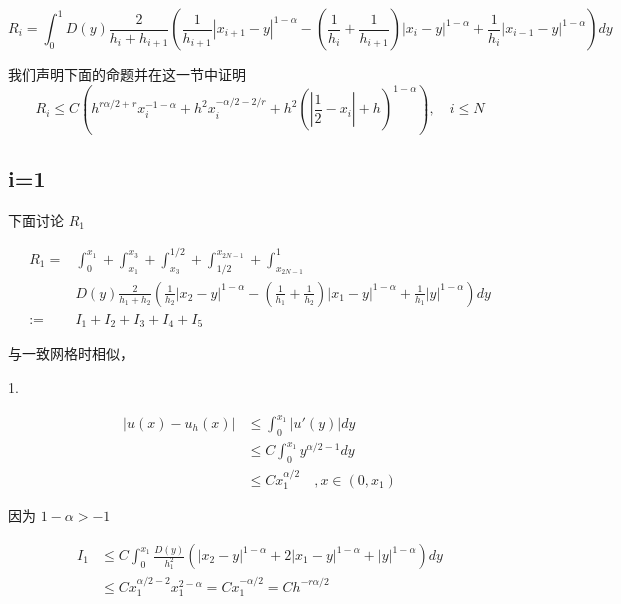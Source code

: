 \documentclass{ctexart}
\begin{document}
\begin{equation}
    R_i = \int_0^1 D(y) \frac{2}{h_i + h_{i+1}}
    ( \frac{1}{h_{i+1}} |x_{i+1}-y|^{1-\alpha}
    - (\frac{1}{h_{i}}+\frac{1}{h_{i+1}}) |x_{i}-y|^{1-\alpha}
    +  \frac{1}{h_{i}}|x_{i-1}-y|^{1-\alpha} )  dy
\end{equation}


我们声明下面的命题并在这一节中证明
\begin{equation}
    R_i \le C(h^{r\alpha/2+r}x_i^{-1-\alpha} + h^2 x_i^{-\alpha/2-2/r} + h^2 (|\frac{1}{2}-x_i|+h)^{1-\alpha}), \quad i\le N
\end{equation}

\subsection{i=1}

下面讨论 \(R_1\)

\begin{equation}
    \begin{aligned}
        R_1 = & \int_0^{x_1} + \int_{x_1}^{x_3} + \int_{x_3}^{1/2} + \int_{1/2}^{x_{2N-1}} + \int_{x_{2N-1}}^1 \\
              & D(y) \frac{2}{h_1 + h_{2}}
        ( \frac{1}{h_{2}} |x_{2}-y|^{1-\alpha}
        - (\frac{1}{h_{1}}+\frac{1}{h_{2}}) |x_{1}-y|^{1-\alpha}
        +  \frac{1}{h_{1}}|y|^{1-\alpha} )  dy                                                                 \\
        :=    & I_1 + I_2 + I_3 + I_4 + I_5
    \end{aligned}
\end{equation}

与一致网格时相似，

1.

\begin{equation}
    \begin{aligned}
        |u(x) - u_h(x)| & \le \int_0^{x_1} |u'(y)| dy                   \\
                        & \le C \int_0^{x_1} y^{\alpha/2-1} dy          \\
                        & \le C x_1^{\alpha/2}    \quad , x\in (0, x_1)
    \end{aligned}
\end{equation}

因为 \(1-\alpha > -1\)

\begin{equation}
    \begin{aligned}
        I_1 & \le C \int_0^{x_1} \frac{D(y)}{h_1^2}
        ( |x_{2}-y|^{1-\alpha}
        +2 |x_{1}-y|^{1-\alpha}
        +|y|^{1-\alpha} )  dy                                                               \\
            & \le C  x_1^{\alpha/2-2} x_1^{2-\alpha} = C x_1^{-\alpha/2} = C h^{-r\alpha/2}
    \end{aligned}
\end{equation}
\end{document}
